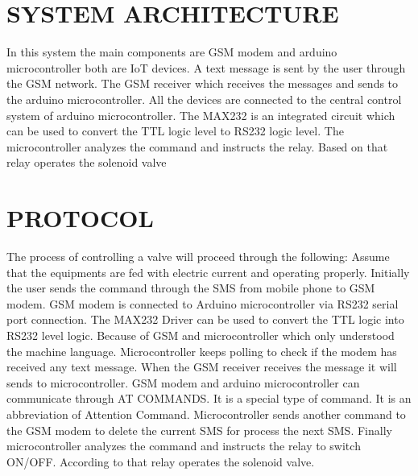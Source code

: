 \documentclass[letterpaper,12pt]{article}
\begin{document}
\section{SYSTEM ARCHITECTURE}

                    In this system the main components are GSM modem and arduino microcontroller both are IoT devices. A text message is sent by the user through the GSM network. The GSM receiver which receives the messages and sends to the arduino microcontroller. All the devices are connected to the central control system of arduino microcontroller. The MAX232 is an integrated circuit which can be used to convert the TTL logic level to RS232 logic level. The microcontroller analyzes the command and instructs the relay. Based on that relay operates the solenoid valve



\section{PROTOCOL}

The process of controlling a valve will proceed through the following: Assume that the equipments are fed with electric current and operating properly. Initially the user sends the command through the SMS from mobile phone to GSM modem. GSM modem is connected to Arduino microcontroller via RS232 serial port connection. The MAX232 Driver can be used to convert the TTL logic into RS232 level logic. Because of GSM and microcontroller which only understood the machine language. Microcontroller keeps polling to check if the modem has received any text message. When the GSM receiver receives the message it will sends to microcontroller. GSM modem and arduino microcontroller can communicate through AT COMMANDS. It is a special type of command. It is an abbreviation of Attention Command. Microcontroller sends another command to the GSM modem to delete the current SMS for process the next SMS. Finally microcontroller analyzes the command and instructs the relay to switch ON/OFF. According to that relay operates the solenoid valve.
\end{document}
